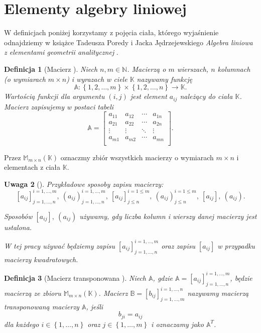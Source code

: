 \documentclass[12pt,a4paper]{report}
\newtheorem{df}{Definicja}[chapter]
\newtheorem{uwaga}[df]{Uwaga}
\newcommand{\set}[1]{\left\lbrace {#1} \right\rbrace}
\newcommand{\setK}{\mathbb{K}}
\newcommand{\setN}{\mathbb{N}}
\begin{document}
\section{Elementy algebry liniowej}

W definicjach poniżej korzystamy z pojęcia ciała, którego wyjaśnienie odnajdziemy w książce Tadeusza Poredy i Jacka Jędrzejewskiego \textit{Algebra liniowa z elementami geometrii analitycznej} {\citep[Sec 4.4]{alzega}}.

\begin{df}[Macierz {\citep[Sec 8.1 Def. 8.1]{alzega}}]
Niech $n,m \in \setN$. Macierzą o $m$ wierszach, $n$ kolumnach (o wymiarach $m \times n$) i wyrazach w ciele $\setK$ nazywamy funkcję 
$$
\mathbb{A}: \set{1,2, \ldots ,m}\times \set{1,2, \ldots ,n} \to \setK.
$$
Wartością funkcji dla argumentu $(i,j)$ jest element $a_{ij}$  należący do ciała $\setK$. Macierz zapisujemy w postaci tabeli
$$
\mathbb{A} = \left[
        \begin{array}{cccc}
         a_{11} & a_{12} & \cdots & a_{1n} \\
         a_{21} & a_{22} & \cdots & a_{2n} \\
         \vdots & \vdots & \ddots & \vdots \\
         a_{m1} & a_{m2} & \cdots & a_{mn} \\
         \end{array}
      \right].
$$
\end{df}
\bigskip
Przez $\mathbb{M}_{m \times n}(\setK)$ oznaczmy zbiór wszystkich macierzy o wymiarach $m \times n$ i elementach z ciała $\setK$.

\begin{uwaga}[{\citep[Sec 8.1]{alzega}}]
Przykładowe sposoby zapisu macierzy:
$$
[a_{ij}]_{j = 1, \ldots, n}^{i = 1, \ldots , m}, \: (a_{ij})_{j = 1, \ldots, n}^{i = 1, \ldots , m}, \: [a_{ij}]_{j \leq n}^{i = 1 \leq m}, \: (a_{ij})_{j \leq n}^{i = 1 \leq m}, \: [a_{ij}], \: (a_{ij}).
$$

Sposobów $[a_{ij}], \: (a_{ij})$ używamy, gdy liczba kolumn i wierszy danej macierzy jest ustalona. 

W tej pracy używać będziemy zapisu $[a_{ij}]_{j = 1, \ldots, n}^{i = 1, \ldots , m}$ oraz zapisu $[a_{ij}]$ w przypadku macierzy kwadratowych.
\end{uwaga}

\begin{df}[Macierz transponowana {\citep[Sec 8.1 ]{alzega}}]
Niech $\mathbb{A}$, gdzie $\mathbb{A} = [a_{ij}]_{j = 1, \ldots, n}^{i = 1, \ldots , m}$, będzie macierzą ze zbioru $\mathbb{M}_{m \times n}(\setK)$.
Macierz $\mathbb{B} = [b_{ij}]_{j = 1, \ldots, m}^{i = 1, \ldots , n}$ nazywamy macierzą transponowaną macierzy $\mathbb{A}$, jeśli 
$$
b_{ji} = a_{ij}
$$ 
dla każdego $i \in \set{1, \ldots, n}$ oraz $j \in \set{1, \ldots ,m}$ i oznaczamy jako $\mathbb{A}^T$.
\end{df}
\end{document}
